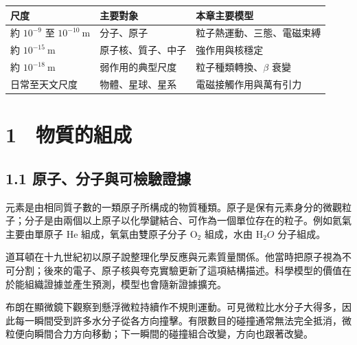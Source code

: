 \documentclass[11pt,a4paper]{article}
\newcounter{none}
\begin{document}
{\def\LTcaptype{none} %
\begin{longtable}[]{@{}
  >{\raggedright\arraybackslash}p{}
  >{\raggedright\arraybackslash}p{}
  >{\raggedright\arraybackslash}p{}@{}}
\toprule\noalign{}
\begin{minipage}[b]{\linewidth}\raggedright
尺度
\end{minipage} & \begin{minipage}[b]{\linewidth}\raggedright
主要對象
\end{minipage} & \begin{minipage}[b]{\linewidth}\raggedright
本章主要模型
\end{minipage} \\
\midrule\noalign{}
\endhead
\bottomrule\noalign{}
\endlastfoot
約 \(10^{-9}\) 至 \(10^{-10}\ \mathrm m\) & 分子、原子 & 粒子熱運動、三態、電磁束縛 \\
約 \(10^{-15}\ \mathrm m\) & 原子核、質子、中子 & 強作用與核穩定 \\
約 \(10^{-18}\ \mathrm m\) & 弱作用的典型尺度 & 粒子種類轉換、\(\beta\) 衰變 \\
日常至天文尺度 & 物體、星球、星系 & 電磁接觸作用與萬有引力 \\
\end{longtable}
}

\section{1　物質的組成}\label{ux7269ux8ceaux7684ux7d44ux6210}

\subsection{1.1 原子、分子與可檢驗證據}\label{ux539fux5b50ux5206ux5b50ux8207ux53efux6aa2ux9a57ux8b49ux64da}

元素是由相同質子數的一類原子所構成的物質種類。原子是保有元素身分的微觀粒子；分子是由兩個以上原子以化學鍵結合、可作為一個單位存在的粒子。例如氦氣主要由單原子 He 組成，氧氣由雙原子分子 \(\mathrm O_2\) 組成，水由 \(\mathrm H_2O\) 分子組成。

道耳頓在十九世紀初以原子說整理化學反應與元素質量關係。他當時把原子視為不可分割；後來的電子、原子核與夸克實驗更新了這項結構描述。科學模型的價值在於能組織證據並產生預測，模型也會隨新證據擴充。

布朗在顯微鏡下觀察到懸浮微粒持續作不規則運動。可見微粒比水分子大得多，因此每一瞬間受到許多水分子從各方向撞擊。有限數目的碰撞通常無法完全抵消，微粒便向瞬間合力方向移動；下一瞬間的碰撞組合改變，方向也跟著改變。
\end{document}
